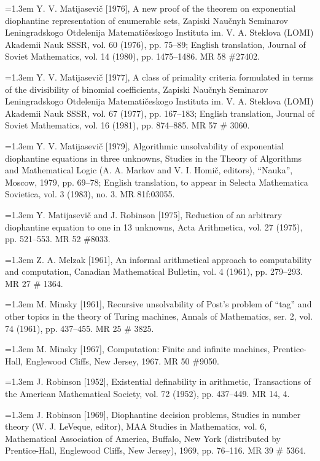 \documentclass[11pt,leqno]{article}
\newcommand{\bibentry}[1]{\par\noindent\hangindent=1.3em\hangafter=1 #1\par\smallskip}
\begin{document}
\bibentry{Y. V. Matijasevi\v{c} [1976], A new proof of the theorem on exponential diophantine representation of enumerable sets, Zapiski Nau\v{c}nyh Seminarov Leningradskogo Otdelenija Matemati\v{c}eskogo Instituta im. V. A. Steklova (LOMI) Akademii Nauk SSSR, vol. 60 (1976), pp. 75--89; English translation, Journal of Soviet Mathematics, vol. 14 (1980), pp. 1475--1486. MR 58 \#27402.}

\bibentry{Y. V. Matijasevi\v{c} [1977], A class of primality criteria formulated in terms of the divisibility of binomial coefficients, Zapiski Nau\v{c}nyh Seminarov Leningradskogo Otdelenija Matemati\v{c}eskogo Instituta im. V. A. Steklova (LOMI) Akademii Nauk SSSR, vol. 67 (1977), pp. 167--183; English translation, Journal of Soviet Mathematics, vol. 16 (1981), pp. 874--885. MR 57 \# 3060.}

\bibentry{Y. V. Matijasevi\v{c} [1979], Algorithmic unsolvability of exponential diophantine equations in three unknowns, Studies in the Theory of Algorithms and Mathematical Logic (A. A. Markov and V. I. Homi\v{c}, editors), ``Nauka'', Moscow, 1979, pp. 69--78; English translation, to appear in Selecta Mathematica Sovietica, vol. 3 (1983), no. 3. MR 81f:03055.}

\bibentry{Y. Matijasevi\v{c} and J. Robinson [1975], Reduction of an arbitrary diophantine equation to one in 13 unknowns, Acta Arithmetica, vol. 27 (1975), pp. 521--553. MR 52 \#8033.}

\bibentry{Z. A. Melzak [1961], An informal arithmetical approach to computability and computation, Canadian Mathematical Bulletin, vol. 4 (1961), pp. 279--293. MR 27 \# 1364.}

\bibentry{M. Minsky [1961], Recursive unsolvability of Post's problem of ``tag'' and other topics in the theory of Turing machines, Annals of Mathematics, ser. 2, vol. 74 (1961), pp. 437--455. MR 25 \# 3825.}

\bibentry{M. Minsky [1967], Computation: Finite and infinite machines, Prentice-Hall, Englewood Cliffs, New Jersey, 1967. MR 50 \#9050.}

\bibentry{J. Robinson [1952], Existential definability in arithmetic, Transactions of the American Mathematical Society, vol. 72 (1952), pp. 437--449. MR 14, 4.}

\bibentry{J. Robinson [1969], Diophantine decision problems, Studies in number theory (W. J. LeVeque, editor), MAA Studies in Mathematics, vol. 6, Mathematical Association of America, Buffalo, New York (distributed by Prentice-Hall, Englewood Cliffs, New Jersey), 1969, pp. 76--116. MR 39 \# 5364.}
\end{document}
